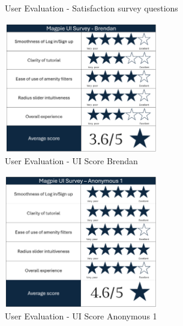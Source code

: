 \begin{figure}[htbp]
    \centering
    \caption{User Evaluation - Satisfaction survey questions}
    \label{fig:userevalquestions}
\end{figure}

\begin{figure}[htbp]
    \centering
    \includegraphics[width=0.6\textwidth]{images/survey-brendan.png}
    \caption{User Evaluation - UI Score Brendan}
    \label{fig:brendanscore}
\end{figure}

\begin{figure}[htbp]
    \centering
    \includegraphics[width=0.6\textwidth]{images/survey-maira.png}
    \caption{User Evaluation - UI Score Anonymous 1}
    \label{fig:mairascore}
\end{figure}

